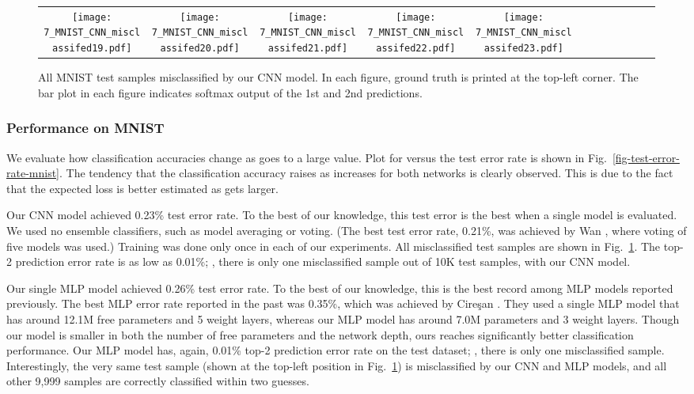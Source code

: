 \documentclass[10pt,twocolumn,letterpaper]{article}
\begin{document}
\begin{figure}[tb]
\begin{center}
\begin{tabular}{cccccccccccc}
\texttt{[image: 7\_MNIST\_CNN\_misclassifed19.pdf]} & \hspace{-0.55cm}
\texttt{[image: 7\_MNIST\_CNN\_misclassifed20.pdf]} & \hspace{-0.55cm}
\texttt{[image: 7\_MNIST\_CNN\_misclassifed21.pdf]} & \hspace{-0.55cm}
\texttt{[image: 7\_MNIST\_CNN\_misclassifed22.pdf]} & \hspace{-0.55cm}
\texttt{[image: 7\_MNIST\_CNN\_misclassifed23.pdf]}
\end{tabular}
\end{center}
\caption{All MNIST test samples misclassified by our CNN model. 
In each figure, ground truth is printed at the top-left corner.
The bar plot in each figure indicates softmax output of the 1st and 2nd predictions.}
\label{fig-MNIST-misclassified}
\end{figure}

\subsubsection{Performance on MNIST}
We evaluate how classification accuracies change as  goes to a large value.
Plot for  versus the test error rate is shown in Fig.~\ref{fig-test-error-rate-mnist}.
The tendency that the classification accuracy raises as  increases for both networks is clearly observed.
This is due to the fact that the expected loss  is better estimated as  gets larger.


Our CNN model achieved 0.23\% test error rate.
To the best of our knowledge, this test error is the best when a single model is evaluated.
We used no ensemble classifiers, such as model averaging or voting.
(The best test error rate, 0.21\%, was achieved by Wan \etal \cite{icml2013_wan13}, 
where voting of five models was used.)
Training was done only once in each of our experiments.
All misclassified test samples are shown in Fig.~\ref{fig-MNIST-misclassified}.
The top-2 prediction error rate is as low as 0.01\%; \ie, there is 
only one misclassified sample out of 10K test samples, 
with our CNN model.

Our single MLP model achieved 0.26\% test error rate.
To the best of our knowledge, this is the best record among MLP models reported previously.
The best MLP error rate reported in the past was 0.35\%, which was achieved by 
Cire{\c s}an \etal \cite{Ciresan:2010}.
They used a single MLP model that has around 12.1M free parameters and 5 weight layers,
whereas our MLP model has around 7.0M parameters and 3 weight layers.
Though our model is smaller in both the number of free parameters and the network depth, 
ours reaches significantly better classification performance.
Our MLP model has, again, 0.01\% top-2 prediction error rate on the test dataset; \ie,
there is only one misclassified sample.
Interestingly, the very same test sample (shown at the top-left position in Fig.~\ref{fig-MNIST-misclassified}) 
is misclassified by our CNN and MLP models, and all other 9,999 samples are correctly classified within two guesses.
\end{document}
